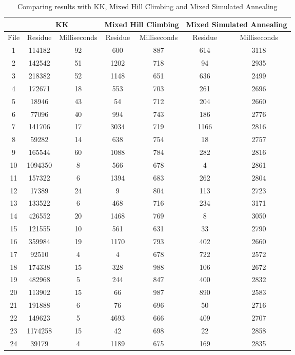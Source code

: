 \documentclass[tikz, 12pt]{scrartcl}
\begin{document}
\begin{longtable}{|c|cc|cc|cc|}
\caption{Comparing results with KK,  Mixed Hill Climbing and Mixed Simulated Annealing}\\
\hline
 	 & \multicolumn{2}{c}{ KK} 	 & \multicolumn{2}{c}{ Mixed Hill Climbing} 	 & \multicolumn{2}{c|}{ Mixed Simulated Annealing} \\
\hline
File	 & Residue 	 & 	 Milliseconds	 & Residue 	 & 	 Milliseconds	 & Residue 	 & 	 Milliseconds\\
\hline
1	 &114182	 & 	92	 &600	 & 	887	 &614	 & 	3118\\
2	 &142542	 & 	51	 &1202	 & 	718	 &94	 & 	2935\\
3	 &218382	 & 	52	 &1148	 & 	651	 &636	 & 	2499\\
4	 &172671	 & 	18	 &553	 & 	703	 &261	 & 	2696\\
5	 &18946	 & 	43	 &54	 & 	712	 &204	 & 	2660\\
6	 &77096	 & 	40	 &994	 & 	743	 &186	 & 	2776\\
7	 &141706	 & 	17	 &3034	 & 	719	 &1166	 & 	2816\\
8	 &59282	 & 	14	 &638	 & 	754	 &18	 & 	2757\\
9	 &165544	 & 	60	 &1088	 & 	784	 &282	 & 	2816\\
10	 &1094350	 & 	8	 &566	 & 	678	 &4	 & 	2861\\
11	 &157322	 & 	6	 &1394	 & 	683	 &262	 & 	2804\\
12	 &17389	 & 	24	 &9	 & 	804	 &113	 & 	2723\\
13	 &133522	 & 	6	 &468	 & 	716	 &234	 & 	3171\\
14	 &426552	 & 	20	 &1468	 & 	769	 &8	 & 	3050\\
15	 &121555	 & 	10	 &561	 & 	631	 &33	 & 	2790\\
16	 &359984	 & 	19	 &1170	 & 	793	 &402	 & 	2660\\
17	 &92510	 & 	4	 &4	 & 	678	 &722	 & 	2572\\
18	 &174338	 & 	15	 &328	 & 	988	 &106	 & 	2672\\
19	 &482968	 & 	5	 &244	 & 	847	 &400	 & 	2832\\
20	 &113902	 & 	15	 &66	 & 	987	 &890	 & 	2583\\
21	 &191888	 & 	6	 &76	 & 	696	 &50	 & 	2716\\
22	 &149623	 & 	5	 &4693	 & 	666	 &409	 & 	2707\\
23	 &1174258	 & 	15	 &42	 & 	698	 &22	 & 	2858\\
24	 &39179	 & 	4	 &1189	 & 	675	 &169	 & 	2835\\

\end{longtable}
\end{document}
